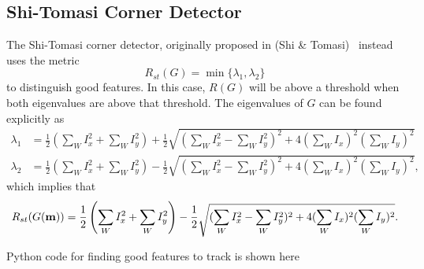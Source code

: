 \subsection{Shi-Tomasi Corner Detector}
The Shi-Tomasi corner detector, originally proposed in (Shi \& Tomasi)~\cite{ShiTomasi94} instead uses the metric
\[
R_{st}(G) = \min\{\lambda_1, \lambda_2\}
\]
to distinguish good features.  In this case, $R(G)$ will be above a threshold when both eigenvalues are above that threshold.  The eigenvalues of $G$ can be found explicitly as 
\begin{align*}
\lambda_1 &= \frac{1}{2}\left(\sum_W I_x^2 + \sum_W I_y^2\right) + \frac{1}{2}\sqrt{(\sum_W I_x^2 - \sum_W I_y^2)^2+4(\sum_W I_x)^2(\sum_W I_y)^2}\\
\lambda_2 &=\frac{1}{2}\left(\sum_W I_x^2 + \sum_W I_y^2\right) - \frac{1}{2}\sqrt{(\sum_W I_x^2 - \sum_W I_y^2)^2+4(\sum_W I_x)^2(\sum_W I_y)^2},
\end{align*}
which implies that
\[
R_{st}(G(\mathbf{m})) = \frac{1}{2}\left(\sum_W I_x^2 + \sum_W I_y^2\right) - \frac{1}{2}\sqrt{(\sum_W I_x^2 - \sum_W I_y^2)^2+4(\sum_W I_x)^2(\sum_W I_y)^2}.
\]



Python code for finding good features to track is shown here~

%

















